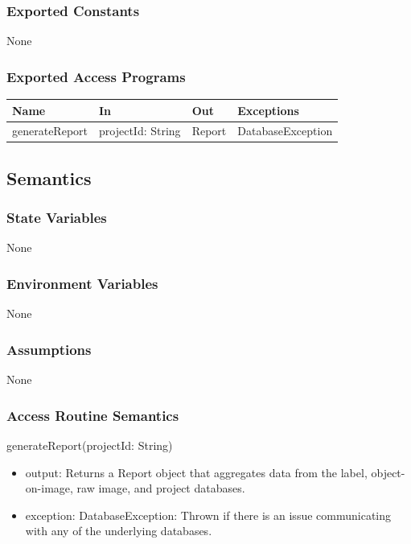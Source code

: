 \documentclass[12pt, titlepage]{article}
\begin{document}
    \subsubsection{Exported Constants}
        None

    \subsubsection{Exported Access Programs}
    \begin{center}\begin{tabular}{p{3cm} p{4cm} p{3cm} p{3cm}}
    \hline\textbf{Name} & \textbf{In} & \textbf{Out} & \textbf{Exceptions} \\
    \hline
        generateReport & projectId: String & Report & DatabaseException \\
    \hline
    \end{tabular}\end{center}

    \subsection{Semantics}
    \subsubsection{State Variables}
        None

    \subsubsection{Environment Variables}
        None

    \subsubsection{Assumptions}
        None

    \subsubsection{Access Routine Semantics}
        \noindent generateReport(projectId: String)
        \begin{itemize}
            \item output: Returns a Report object that aggregates data from the label, object-on-image, raw image, and project databases.
            \item exception: DatabaseException: Thrown if there is an issue communicating with any of the underlying databases.
        \end{itemize}
\end{document}
